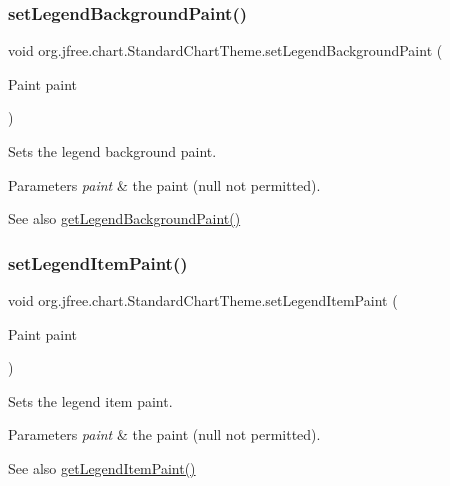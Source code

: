 \subsubsection{\texorpdfstring{set\+Legend\+Background\+Paint()}{setLegendBackgroundPaint()}}
{\footnotesize\ttfamily void org.\+jfree.\+chart.\+Standard\+Chart\+Theme.\+set\+Legend\+Background\+Paint (\begin{DoxyParamCaption}\item[{Paint}]{paint }\end{DoxyParamCaption})}

Sets the legend background paint.


\begin{DoxyParams}{Parameters}
{\em paint} & the paint ({\ttfamily null} not permitted).\\
\hline
\end{DoxyParams}
\begin{DoxySeeAlso}{See also}
\mbox{\hyperlink{classorg_1_1jfree_1_1chart_1_1_standard_chart_theme_a5288003c0d9a02190cea19ae79b510c0}{get\+Legend\+Background\+Paint()}} 
\end{DoxySeeAlso}
\mbox{\label{classorg_1_1jfree_1_1chart_1_1_standard_chart_theme_aad77d72f359f37a618c34d0f404b00fa}} 
\subsubsection{\texorpdfstring{set\+Legend\+Item\+Paint()}{setLegendItemPaint()}}
{\footnotesize\ttfamily void org.\+jfree.\+chart.\+Standard\+Chart\+Theme.\+set\+Legend\+Item\+Paint (\begin{DoxyParamCaption}\item[{Paint}]{paint }\end{DoxyParamCaption})}

Sets the legend item paint.


\begin{DoxyParams}{Parameters}
{\em paint} & the paint ({\ttfamily null} not permitted).\\
\hline
\end{DoxyParams}
\begin{DoxySeeAlso}{See also}
\mbox{\hyperlink{classorg_1_1jfree_1_1chart_1_1_standard_chart_theme_a892baea00955745f630d087e079add9e}{get\+Legend\+Item\+Paint()}} 
\end{DoxySeeAlso}
\mbox{\label{classorg_1_1jfree_1_1chart_1_1_standard_chart_theme_a828da90a85a9f3cc3b592e0d588d8eb3}} 
